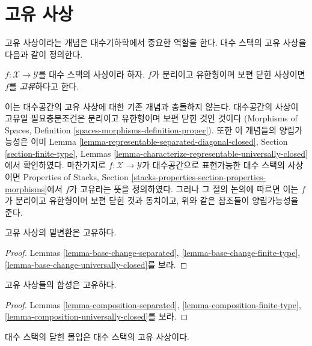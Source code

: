 \section{고유 사상}
\label{section-proper}

\noindent
고유 사상이라는 개념은 대수기하학에서 중요한 역할을 한다. 대수 스택의
고유 사상을 다음과 같이 정의한다.

\begin{definition}
\label{definition-proper}
$f : \mathcal{X} \to \mathcal{Y}$를 대수 스택의 사상이라 하자. $f$가
분리이고 유한형이며 보편 닫힌 사상이면 $f$를 {\it 고유}하다고 한다.
\end{definition}

\noindent
이는 대수공간의 고유 사상에 대한 기존 개념과 충돌하지 않는다. 대수공간의
사상이 고유일 필요충분조건은 분리이고 유한형이며 보편 닫힌 것인 것이다
(Morphisms of Spaces, Definition \ref{spaces-morphisms-definition-proper}).
또한 이 개념들의 양립가능성은 이미 Lemma
\ref{lemma-representable-separated-diagonal-closed}, Section
\ref{section-finite-type}, Lemmas
\ref{lemma-characterize-representable-universally-closed}에서 확인하였다.
마찬가지로 $f : \mathcal{X} \to \mathcal{Y}$가 대수공간으로 표현가능한
대수 스택의 사상이면 Properties of Stacks, Section
\ref{stacks-properties-section-properties-morphisms}에서 $f$가 고유라는 뜻을
정의하였다. 그러나 그 절의 논의에 따르면 이는 $f$가 분리이고 유한형이며
보편 닫힌 것과 동치이고, 위와 같은 참조들이 양립가능성을 준다.

\begin{lemma}
\label{lemma-base-change-proper}
고유 사상의 밑변환은 고유하다.
\end{lemma}

\begin{proof}
Lemmas \ref{lemma-base-change-separated},
\ref{lemma-base-change-finite-type},
\ref{lemma-base-change-universally-closed}를 보라.
\end{proof}

\begin{lemma}
\label{lemma-composition-proper}
고유 사상들의 합성은 고유하다.
\end{lemma}

\begin{proof}
Lemmas \ref{lemma-composition-separated},
\ref{lemma-composition-finite-type},
\ref{lemma-composition-universally-closed}를 보라.
\end{proof}

\begin{lemma}
\label{lemma-closed-immersion-proper}
대수 스택의 닫힌 몰입은 대수 스택의 고유 사상이다.
\end{lemma}

